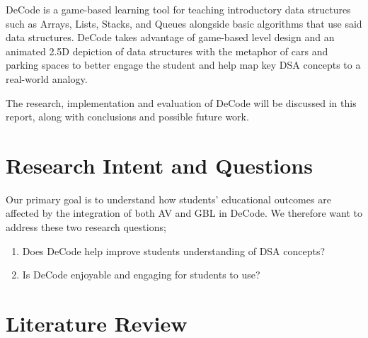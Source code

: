 \documentclass[11pt]{article}
\begin{document}
DeCode is a game-based learning tool for teaching introductory data structures such as Arrays, Lists, Stacks, and Queues alongside basic algorithms that use said data structures. DeCode takes advantage of game-based level design and an animated 2.5D depiction of data structures with the metaphor of cars and parking spaces to better engage the student and help map key DSA concepts to a real-world analogy.\par
The research, implementation and evaluation of DeCode will be discussed in this report, along with conclusions and possible future work.
\section{Research Intent and Questions}
Our primary goal is to understand how students' educational outcomes are affected by the integration of both AV and GBL in DeCode. We therefore want to address these two research questions;
\begin{spacing}{1.5}
\begin{enumerate}
  \item Does DeCode help improve students understanding of DSA concepts?
  \item Is DeCode enjoyable and engaging for students to use?
\end{enumerate}
\end{spacing}
\section{Literature Review}
\end{document}
